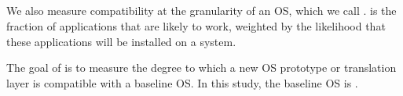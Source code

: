 \begin{comment}
\paragraph{Formal Definition.}
A given system installation ($\mathtt{Inst}$)
is a set of packages installed ($\{\mathtt{pkg}_1, \mathtt{pkg}_2, ..., \mathtt{pkg}_k \in \mathtt{Pkg}_\mathtt{all}\}$).
For each package $\mathtt{pkg}$ in the \osdist{} repository,
our framework generates the API footprint as 
${\mathtt{Footprint}}_\mathtt{pkg} = \{\mathtt{api}_1, \mathtt{api}_2, ..., \mathtt{api}_k \in \mathtt{API}_\mathtt{all}\}$.  
For an API supported by the OS, we calculate the \usagemetric{} as the product 
of probabilities that an installed package will require this API.
This is calculated as follows:
\begin{align*}
&\mathtt{Dependent}_\mathtt{api} = \{\mathtt{pkg}|\mathtt{api} \in \mathtt{Footprint}_\mathtt{pkg}\} \\
&\mathtt{Importance}(\mathtt{api}) = Pr\{\mathtt{Dependent}_\mathtt{api} \bigcap \mathtt{Inst} \neq \emptyset\} \\
&= 1 - Pr\{\forall \mathtt{pkg} \in \mathtt{Dependent}_\mathtt{api}, \mathtt{pkg} \notin \mathtt{Inst}\} \\
&= 1 - \prod_{\mathtt{pkg} \in \mathtt{Dependent}_\mathtt{api}} Pr\{\mathtt{pkg} \notin \mathtt{Inst}\} \\
&= 1 - \prod_{\mathtt{pkg} \in \mathtt{Dependent}_\mathtt{api}} (1 - \frac{\text{installation of $\mathtt{pkg}$}}{\text{total installation}})
\end{align*}
\end{comment}


\subsection{\CompatMetric{}}

We also measure compatibility at the granularity of an OS,
which we call \compatmetric{}.
\Compatmetric{} is the fraction of applications that are likely to work,
weighted by the likelihood that these applications will be installed on a system.

The goal of \compatmetric{} is to measure the degree to which a
new OS prototype or translation layer is compatible with a baseline OS.
In this study, the baseline OS is \osdist{}.



